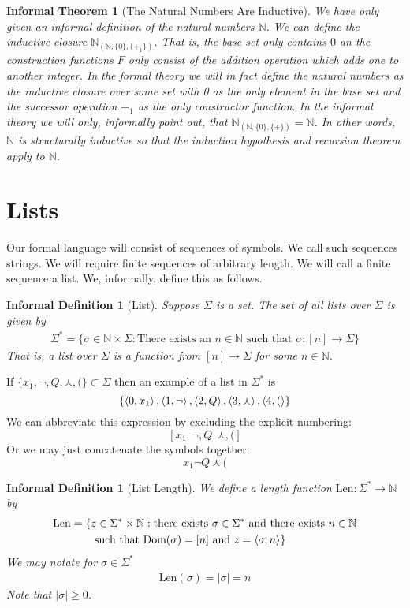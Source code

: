 \documentclass[12pt]{article}
\theoremstyle{break}
\theoremstyle{break}
\theoremstyle{break}
\theoremstyle{break}
\theoremstyle{break}
\newtheorem{informal definition}[definition]{Informal Definition}
\theoremstyle{break}
\newtheorem{informal theorem}[theorem]{Informal Theorem}
\newcommand{\natnum}[0]{\mathbb{N}}
\begin{document}
	\begin{informal theorem}[The Natural Numbers Are Inductive]
		We have only given an informal definition of the natural numbers $\natnum$.
		We can define the inductive closure $\natnum_{(\natnum, \{0\}, \{+_1\})}$.
		That is, the base set only contains $0$ an the construction functions $F$ only consist of the addition operation which adds one to another integer.
		In the formal theory we will in fact define the natural numbers as the inductive closure over some set with 0 as the only element in the base set and the successor operation $+_1$ as the only constructor function.
		In the informal theory we will only, informally point out, that $\natnum_{(\natnum, \{0\}, \{+\})} = \natnum$.
		In other words, $\natnum$ is structurally inductive so that the induction hypothesis and recursion theorem apply to $\natnum$.
	\end{informal theorem}
	
	\section{Lists}
	
	Our formal language will consist of sequences of symbols.
	We call such sequences strings.
	We will require finite sequences of arbitrary length.
	We will call a finite sequence a list.
	We, informally, define this as follows.
	
	\begin{informal definition}[List]
		Suppose $\Sigma$ is a set.
		The set of all lists over $\Sigma$ is given by
		\begin{align*}
			\Sigma^* = \{\sigma \in \natnum\times \Sigma: \text{There exists an } n\in \natnum \text{ such that } \sigma: [n] \to \Sigma\}
		\end{align*}
		That is, a list over $\Sigma$ is a function from $[n] \to \Sigma$ for some $n\in\natnum$.
	\end{informal definition}
	
	If $\{x_1, \lnot, Q, \curlywedge, (\} \subset \Sigma$ then an example of a list in $\Sigma^*$ is
	$$
	\{\braket{0, x_1}, \braket{1, \lnot}, \braket{2, Q}, \braket{3, \curlywedge}, \braket{4, (}\}
	$$
	We can abbreviate this expression by excluding the explicit numbering:
	$$
	[x_1, \lnot, Q, \curlywedge, (]
	$$
	Or we may just concatenate the symbols together:
	$$
	x_1 \lnot Q \curlywedge (
	$$
	
	\begin{informal definition}[List Length]
		We define a length function $\text{Len}:\Sigma^* \to \natnum$ by
		\begin{align*}
			\text{Len} = \{&z \in \Sigma^* \times \natnum: \text{there exists } \sigma \in \Sigma^* \text{ and there exists } n \in \natnum\\
			& \text{ such that } \text{Dom}(\sigma) = [n] \text{ and } z = \braket{\sigma, n}\}
		\end{align*}
		We may notate for $\sigma \in \Sigma^*$
		\begin{align*}
			\text{Len}(\sigma) = |\sigma| = n
		\end{align*}
		Note that $|\sigma| \ge 0$.
	\end{informal definition}
	
\end{document}
